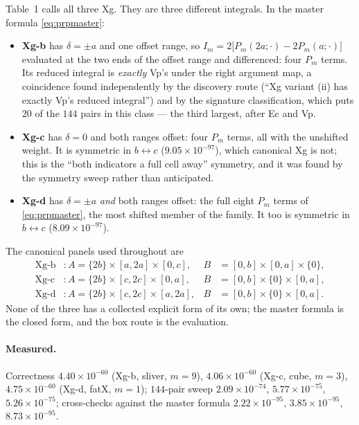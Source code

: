 \documentclass[11pt]{article}
\theoremstyle{remark}
\begin{document}
Table~1 calls all three Xg. They are three different integrals. In the master formula
\eqref{eq:prpmaster}:
\begin{itemize}[nosep]
\item \textbf{Xg-b} has $\delta = \pm a$ and one offset range, so
$I_m = 2\bigl[P_m(2a;\cdot) - 2P_m(a;\cdot)\bigr]$ evaluated at the two ends of the offset
range and differenced: four $P_m$ terms. Its reduced integral is \emph{exactly} Vp's under
the right argument map, a coincidence found independently by the discovery route
(``Xg variant (ii) has exactly Vp's reduced integral'') and by the signature
classification, which puts $20$ of the $144$ pairs in this class --- the third largest,
after Ec and Vp.
\item \textbf{Xg-c} has $\delta = 0$ and both ranges offset: four $P_m$ terms, all with
the unshifted weight. It is symmetric in $b\leftrightarrow c$ ($9.05\times10^{-97}$),
which canonical Xg is not; this is the ``both indicators a full cell away'' symmetry, and
it was found by the symmetry sweep rather than anticipated.
\item \textbf{Xg-d} has $\delta = \pm a$ \emph{and} both ranges offset: the full eight
$P_m$ terms of \eqref{eq:prpmaster}, the most shifted member of the family. It too is
symmetric in $b\leftrightarrow c$ ($8.09\times10^{-97}$).
\end{itemize}
The canonical panels used throughout are
\begin{align}
\text{Xg-b}&: A = \{2b\}\times[a,2a]\times[0,c], & B &= [0,b]\times[0,a]\times\{0\},\\
\text{Xg-c}&: A = \{2b\}\times[c,2c]\times[0,a], & B &= [0,b]\times\{0\}\times[0,a],\\
\text{Xg-d}&: A = \{2b\}\times[c,2c]\times[a,2a], & B &= [0,b]\times\{0\}\times[0,a].
\end{align}
None of the three has a collected explicit form of its own; the master formula is the
closed form, and the box route is the evaluation.

\paragraph{Measured.} Correctness $4.40\times10^{-60}$ (Xg-b, sliver, $m=9$),
$4.06\times10^{-60}$ (Xg-c, cube, $m=3$), $4.75\times10^{-60}$ (Xg-d, fatX, $m=1$);
$144$-pair sweep $2.09\times10^{-74}$, $5.77\times10^{-75}$, $5.26\times10^{-75}$;
cross-checks against the master formula $2.22\times10^{-95}$, $3.85\times10^{-95}$,
$8.73\times10^{-95}$.
\end{document}

